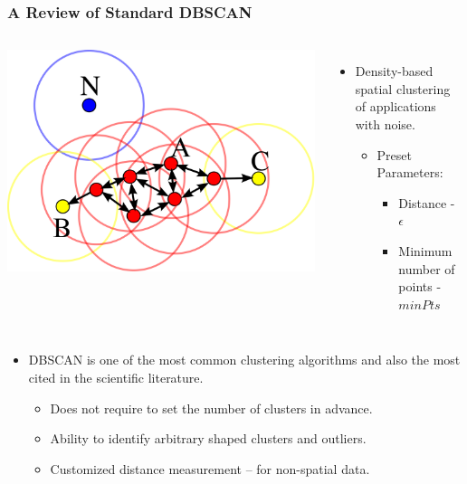 \begin{frame}
    \frametitle{A Review of Standard DBSCAN}
    \begin{columns}
             \centering
             \includegraphics[width=\textwidth]{resource/figures/dbscan.png}
              \begin{itemize}
                  \item Density-based spatial clustering of applications with noise.
                  \begin{itemize}
                      \item Preset Parameters:
                      \begin{itemize}
                          \item Distance - $\epsilon$
                          \item Minimum number of points - $minPts$
                      \end{itemize}
                  \end{itemize}
              \end{itemize}
    \end{columns} 
    \vspace{0.3cm}
    \begin{itemize}
        \item DBSCAN is one of the most common clustering algorithms and also the most cited in the scientific literature.
        \begin{itemize}
            \item Does not require to set the number of clusters in advance.
            \item Ability to identify arbitrary shaped clusters and outliers.
            \item Customized distance measurement – for non-spatial data.
        \end{itemize}
    \end{itemize}
\end{frame}

